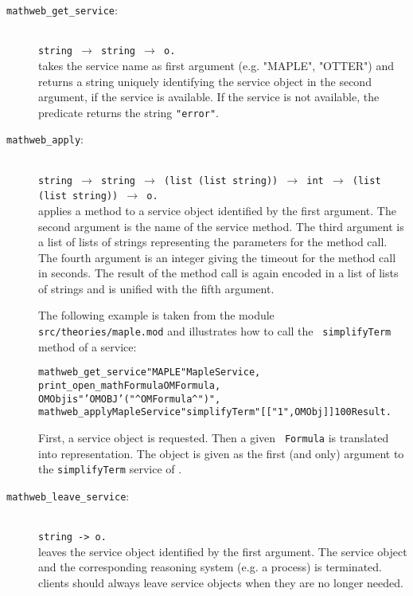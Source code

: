 \begin{description}
\item[{\tt mathweb\_get\_service}:]\ \\
  \hspace*{-1cm} {\small \tt string $\rightarrow$ string $\rightarrow$ o.}\\
  takes the service name as first argument (e.g.  "MAPLE", "OTTER")
  and returns a string uniquely identifying the service object in the
  second argument, if the service is available. If the service is not
  available, the predicate returns the string {\tt "error"}.
  
\item[{\tt mathweb\_apply}:]\ \\
  \hspace*{-1cm} {\small \tt string $\rightarrow$ string $\rightarrow$
    (list (list string)) $\rightarrow$ int $\rightarrow$ (list (list
    string)) $\rightarrow$ o.}\ \\ applies a method to a service
  object identified by the first argument. The second argument is the
  name of the service method. The third argument is a list of lists of
  strings representing the parameters for the method call. The fourth
  argument is an integer giving the timeout for the method call in
  seconds. The result of the method call is again encoded in a list of
  lists of strings and is unified with the fifth argument.
  
  The following example is taken from the module {\tt
    src/theories/maple.mod} and illustrates how to call the {\tt
    simplifyTerm} method of a {\maple} service:
  \begin{alltt}
mathweb_get_service "MAPLE" MapleService, 
print_open_math Formula OMFormula, 
OMObj is "'OMOBJ'(" ^ OMFormula ^ ")", 
mathweb_apply MapleService "simplifyTerm" [["1", OMObj]] 100 Result.
 \end{alltt} \vspace*{-0.4cm}
 First, a {\maple} service object is requested. Then a given {\tt
   Formula} is translated into {\openmath} representation. The
 {\openmath} object is given as the first (and only) argument to the
 {\tt simplifyTerm} service of {\maple}.
\item[{\tt mathweb\_leave\_service}:] \ \\
  {\small\tt  string -> o.}\\
  leaves the service object identified by the first argument. The
  service object and the corresponding reasoning system (e.g. a
  {\maple} process) is terminated. {\mathwebsb} clients should always
  leave service objects when they are no longer needed.
\end{description}


